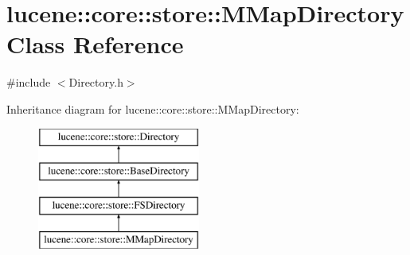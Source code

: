 \hypertarget{classlucene_1_1core_1_1store_1_1MMapDirectory}{}\section{lucene\+:\+:core\+:\+:store\+:\+:M\+Map\+Directory Class Reference}
\label{classlucene_1_1core_1_1store_1_1MMapDirectory}


{\ttfamily \#include $<$Directory.\+h$>$}

Inheritance diagram for lucene\+:\+:core\+:\+:store\+:\+:M\+Map\+Directory\+:\begin{figure}[H]
\begin{center}
\leavevmode
\includegraphics[height=4.000000cm]{classlucene_1_1core_1_1store_1_1MMapDirectory}
\end{center}
\end{figure}
